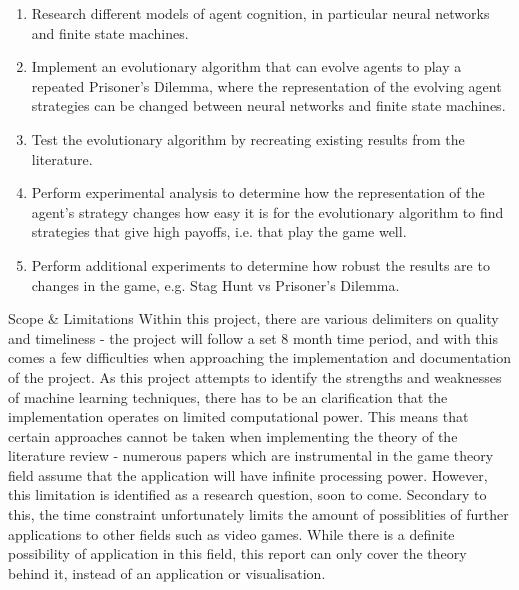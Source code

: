 \documentclass[12pt,a4paper]{article}
\makeatletter
\renewcommand\subsection{\@startsection {subsection}{1}{2mm}
                               {3pt plus 2pt minus 1pt}
                               {3pt plus 0pt}
                               {\normalfont\bfseries}}
\makeatother
\begin{document}
\begin{enumerate}
  \item Research different models of agent cognition, in particular neural networks and finite state machines.
  \item Implement an evolutionary algorithm that can evolve agents to play a repeated Prisoner's Dilemma, where the representation of the evolving agent strategies can be changed between neural networks and finite state machines.
  \item Test the evolutionary algorithm by recreating existing results from the literature.
  \item Perform experimental analysis to determine how the representation of the agent's strategy changes how easy it is for the evolutionary algorithm to find strategies that give high payoffs, i.e. that play the game well.
  \item Perform additional experiments to determine how robust the results are to changes in the game, e.g. Stag Hunt vs Prisoner's Dilemma. \\
\end{enumerate}

\subsection{Scope \& Limitations}
Within this project, there are various delimiters on quality and timeliness - the project will follow a set 8 month time period, and with this comes a few difficulties when approaching the implementation and documentation of the project. As this project attempts to identify the strengths and weaknesses of machine learning techniques, there has to be an clarification that the implementation operates on limited computational power. This means that certain approaches cannot be taken when implementing the theory of the literature review - numerous papers which are instrumental in the game theory field assume that the application will have infinite processing power. However, this limitation is identified as a research question, soon to come. Secondary to this, the time constraint unfortunately limits the amount of possiblities of further applications to other fields such as video games. While there is a definite possibility of application in this field, this report can only cover the theory behind it, instead of an application or visualisation.
\end{document}
